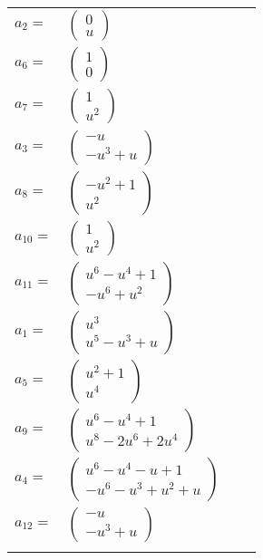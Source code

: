 \documentclass[1p]{elsarticle_modified}
\theoremstyle{definition}
\begin{document}
\begin{tabular}{m{7pt} m{180pt} m{7pt} m{180pt} }
\flushright $a_{2}=$&$\begin{pmatrix}0\\u\end{pmatrix}$ \\
\flushright $a_{6}=$&$\begin{pmatrix}1\\0\end{pmatrix}$ \\
\flushright $a_{7}=$&$\begin{pmatrix}1\\u^2\end{pmatrix}$ \\
\flushright $a_{3}=$&$\begin{pmatrix}- u\\- u^3+u\end{pmatrix}$ \\
\flushright $a_{8}=$&$\begin{pmatrix}- u^2+1\\u^2\end{pmatrix}$ \\
\flushright $a_{10}=$&$\begin{pmatrix}1\\u^2\end{pmatrix}$ \\
\flushright $a_{11}=$&$\begin{pmatrix}u^6- u^4+1\\- u^6+u^2\end{pmatrix}$ \\
\flushright $a_{1}=$&$\begin{pmatrix}u^3\\u^5- u^3+u\end{pmatrix}$ \\
\flushright $a_{5}=$&$\begin{pmatrix}u^2+1\\u^4\end{pmatrix}$ \\
\flushright $a_{9}=$&$\begin{pmatrix}u^6- u^4+1\\u^8-2 u^6+2 u^4\end{pmatrix}$ \\
\flushright $a_{4}=$&$\begin{pmatrix}u^6- u^4- u+1\\- u^6- u^3+u^2+u\end{pmatrix}$ \\
\flushright $a_{12}=$&$\begin{pmatrix}- u\\- u^3+u\end{pmatrix}$\\&\end{tabular}
\end{document}
